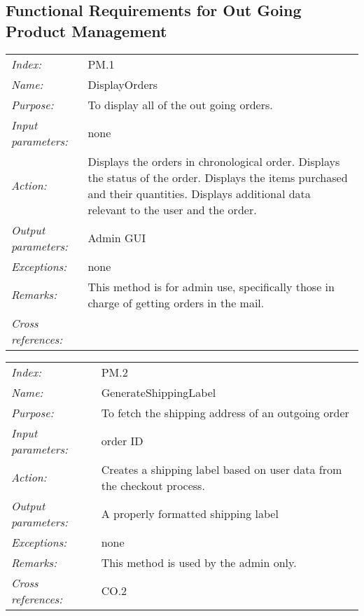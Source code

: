 \documentclass[10pt,letter]{article}
\begin{document}
\subsection{Functional Requirements for Out Going Product Management}


\begin{tabularx}{\textwidth}{l X}

    \it{Index:} & PM.1 \\

    \it{Name:} &  DisplayOrders\\

    \it{Purpose:} &  To display all of the out going orders. \\

    \it{Input parameters:} & none \\

    \it{Action:} & Displays the orders in chronological order. Displays the status of the order. Displays the items purchased and their quantities. Displays additional data relevant to the user and the order.\\

    \it{Output parameters:} & Admin GUI \\

    \it{Exceptions:} & none \\

    \it{Remarks:} & This method is for admin use, specifically those in charge of getting orders in the mail.\\

    \it{Cross references:} & \\

    \hline

\end{tabularx}
\begin{tabularx}{\textwidth}{l X}

    \it{Index:} & PM.2 \\

    \it{Name:} &  GenerateShippingLabel\\

    \it{Purpose:} & To fetch the shipping address of an outgoing order \\

    \it{Input parameters:} & order ID \\

    \it{Action:} & Creates a shipping label based on user data from the checkout process. \\

    \it{Output parameters:} & A properly formatted shipping label\\

    \it{Exceptions:} & none \\

    \it{Remarks:} & This method is used by the admin only.\\

    \it{Cross references:} & CO.2\\

    \hline

\end{tabularx}
\end{document}
